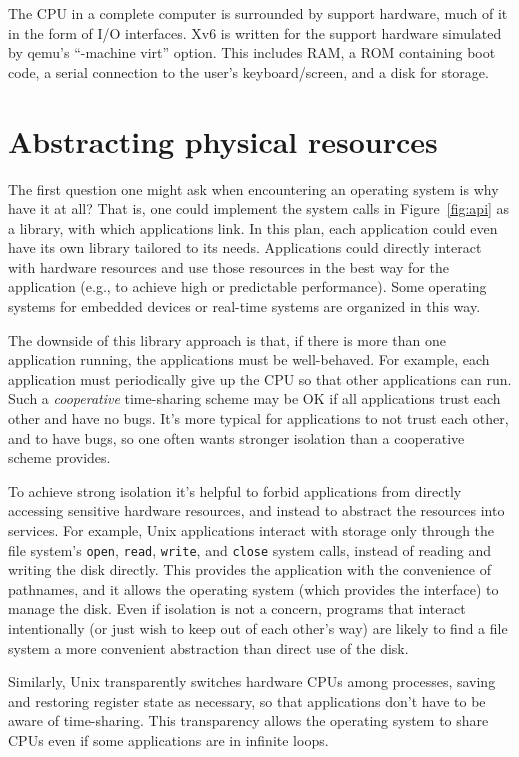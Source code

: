 The CPU in a complete computer is surrounded by support hardware, much
of it in the form of I/O interfaces. Xv6 is written for the support
hardware simulated by qemu's ``-machine virt'' option. This includes
RAM, a ROM containing boot code, a serial connection to the user's
keyboard/screen, and a disk for storage.

\section{Abstracting physical resources}

The first question one might ask when encountering an operating system is why
have it at all?  That is, one could implement the system calls in
Figure~\ref{fig:api}
as a library, with which applications link.  In this plan,
each application could even have its own library tailored to its needs.
Applications could directly interact with hardware resources
and use those resources in the best way for the application (e.g., to achieve
high or predictable performance).  Some operating systems for
embedded devices or real-time systems are organized in this way.

The downside of this library approach is that, if there is more than one
application running, the applications must be well-behaved.
For example, each application must periodically give up the
CPU so that other applications can run.
Such a 
\textit{cooperative} 
time-sharing scheme may be OK if all applications trust each
other and have no bugs. It's more typical for applications
to not trust each other, and to have bugs, so one often wants
stronger isolation than a cooperative scheme provides.

To achieve strong isolation it's helpful to forbid applications from
directly accessing sensitive hardware resources, and instead to abstract the
resources into services.  For example, Unix applications interact with storage
only through the file system's
\lstinline{open},
\lstinline{read},
\lstinline{write}, 
and
\lstinline{close}
system calls,
instead of reading and writing the disk directly. 
This provides the application with the convenience of pathnames, and it allows
the operating system (which provides the interface) to manage the disk. 
Even if isolation is not a concern,
programs that interact intentionally (or just wish to keep
out of each other's way) are likely to find a file system a more convenient
abstraction than direct use of the disk.

Similarly, Unix transparently switches hardware CPUs among processes,
saving and restoring register state as necessary,
so that applications don't have to be
aware of time-sharing.  This transparency allows the operating system to share
CPUs even if some applications are in infinite loops.

